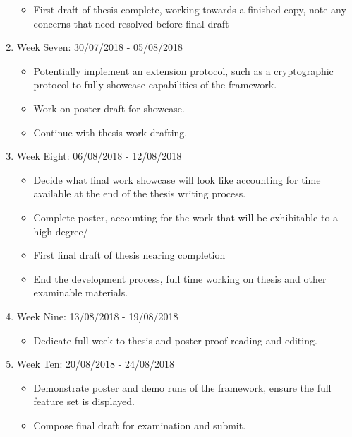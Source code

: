 \documentclass{article}
\begin{document}
\begin{enumerate}
\begin{itemize}
			\item First draft of thesis complete, working towards a finished copy, note any concerns that need resolved before final draft
		\end{itemize}
		\item Week Seven: 30/07/2018 - 05/08/2018
		\begin{itemize}
			\item Potentially implement an extension protocol, such as a cryptographic protocol to fully showcase capabilities of the framework.
			\item Work on poster draft for showcase.
			\item Continue with thesis work drafting.
		\end{itemize}
		\item Week Eight: 06/08/2018 - 12/08/2018
		\begin{itemize}
			\item Decide what final work showcase will look like accounting for time available at the end of the thesis writing process.
			\item Complete poster, accounting for the work that will be exhibitable to a high degree/
			\item First final draft of thesis nearing completion
			\item End the development process, full time working on thesis and other examinable materials.
		\end{itemize}
		\item Week Nine: 13/08/2018 - 19/08/2018
		\begin{itemize}
			\item Dedicate full week to thesis and poster proof reading and editing.
		\end{itemize}
		\item Week Ten: 20/08/2018 - 24/08/2018
		\begin{itemize}
			\item Demonstrate poster and demo runs of the framework, ensure the full feature set is displayed.
			\item Compose final draft for examination and submit.
		\end{itemize}
	\end{enumerate}
	\pagebreak
	\printbibliography
\end{document}
